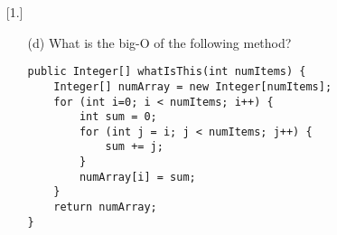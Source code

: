 \documentclass[letter]{article}
\begin{document}
\begin{enumerate} [1.]
\begin{itemize}
        \begin{verbatim}
public static void hmmmmmm(int n) {
    for (int i=0; i < n; i++) {
        for (int j = 0; j < 1000000; j++) {
            System.out.println("Good luck!") //You may assume that this is O(1)
        }
    }
}
        \end{verbatim}
        \item [(d)] What is the big-O of the following method?

\begin{verbatim}
public Integer[] whatIsThis(int numItems) {
    Integer[] numArray = new Integer[numItems];
    for (int i=0; i < numItems; i++) {
        int sum = 0;
        for (int j = i; j < numItems; j++) {
            sum += j;
        }
        numArray[i] = sum;
    }
    return numArray;
}
\end{verbatim}
        

        
    \end{itemize}

    


    
\end{enumerate}
\end{document}
